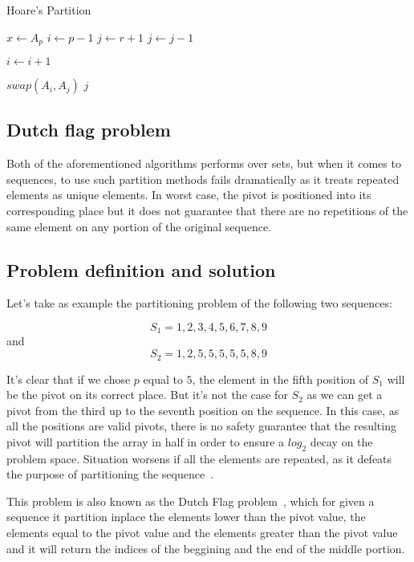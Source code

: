 \begin{algorithm}
\caption{Hoare's Partition}\label{ALG:HOARE_PARTITION}
\begin{algorithmic}[1]
    \State $x \gets A_p$
    \State $i \gets p-1$
    \State $j \gets r+1$
        \Do 
            \State $j \gets j - 1$

        \Do 
            \State $i \gets i + 1$

            \State $swap(A_i, A_j)$
        \Else
            \State \Return $j$
        \EndIf
    \EndWhile
    \EndProcedure
\end{algorithmic}
\end{algorithm}

\subsection{Dutch flag problem}
\label{SUBSEC:DUTCH_FLAG_PROBLEM}
Both of the aforementioned algorithms performs over sets, but when it comes to sequences, to use such partition methods fails dramatically as it treats repeated elements as unique elements. In worst case, the pivot is positioned into its corresponding place but it does not guarantee that there are no repetitions of the same element on any portion of the original sequence.

\subsection{Problem definition and solution}
Let's take as example the partitioning problem of the following two sequences:

$$ S_1={1,2,3,4,5,6,7,8,9} $$
and
$$S_2={1,2,5,5,5,5,5,8,9}$$

It's clear that if we chose $p$ equal to $5$, the element in the fifth position of $S_1$ will be the pivot on its correct place. But it's not the case for $S_2$ as we can get a pivot from the third up to the seventh position on the sequence. In this case, as all the positions are valid pivots, there is no safety guarantee that the resulting pivot will partition the array in half in order to ensure a $log_2$ decay on the problem space. Situation worsens if all the elements are repeated, as it defeats the purpose of partitioning the sequence~\cite{7416566}.

This problem is also known as the Dutch Flag problem~\cite{10.5555/550359}, which for given a sequence it partition inplace the elements lower than the pivot value, the elements equal to the pivot value and the elements greater than the pivot value and it will return the indices of the beggining and the end of the middle portion.

